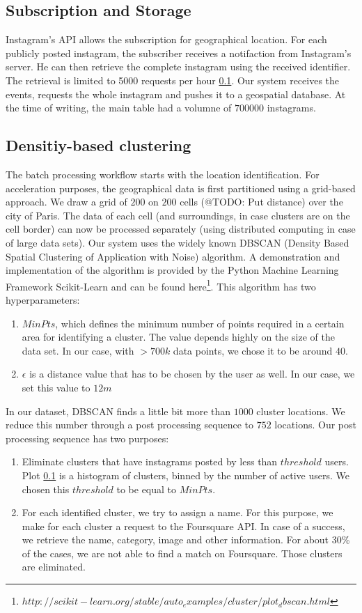 \subsection{Subscription and Storage}
Instagram's API allows the subscription for geographical location. For each publicly posted instagram, the subscriber receives a notifaction from Instagram's server. He can then retrieve the complete instagram using the received identifier. The retrieval is limited to 5000 requests per hour \ref{}. Our system receives the events, requests the whole instagram and pushes it to a geospatial database. At the time of writing, the main table had a volumne of $700000$ instagrams.

\subsection{Densitiy-based clustering}
\label{sec:dbscan}
The batch processing workflow starts with the location identification. For acceleration purposes, the geographical data is first partitioned using a grid-based approach. We draw a grid of $200$ on $200$ cells (@TODO: Put distance) over the city of Paris. The data of each cell (and surroundings, in case clusters are on the cell border) can now be processed separately (using distributed computing in case of large data sets). Our system uses the widely known DBSCAN \cite{Ester96adensity-based} (Density Based Spatial Clustering of Application with Noise) algorithm. A demonstration and implementation of the algorithm is provided by the Python Machine Learning Framework Scikit-Learn \cite{scikit-learn} and can be found here\footnote{$http://scikit-learn.org/stable/auto_examples/cluster/plot_dbscan.html$}. This algorithm has two hyperparameters:
\begin{enumerate}
  \item $MinPts$, which defines the minimum number of points required in a certain area for identifying a cluster. The value depends highly on the size of the data set. In our case, with $>700k$ data points, we chose it to be around $40$.
  \item $\epsilon$ is a distance value that has to be chosen by the user as well. In our case, we set this value to $12m$
\end{enumerate}

In our dataset, DBSCAN finds a little bit more than $1000$ cluster locations. We reduce this number through a post processing sequence to $752$ locations. Our post processing sequence has two purposes:
\begin{enumerate}
  \item Eliminate clusters that have instagrams posted by less than $threshold$ users. Plot \ref{} is a histogram of clusters, binned by the number of active users. We chosen this $threshold$ to be equal to $MinPts$.
  \item For each identified cluster, we try to assign a name. For this purpose, we make for each cluster a request to the Foursquare API. In case of a success, we retrieve the name, category, image and other information. For about 30\% of the cases, we are not able to find a match on Foursquare. Those clusters are eliminated.
\end{enumerate}

